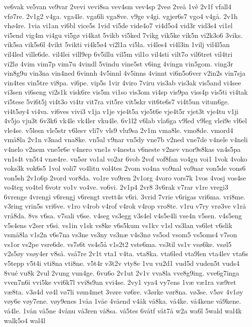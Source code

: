 {ve6vak
ve5van
ve9var
2vevi
vevi8sa
vev4sm
vev4sp
2veø
2veå
1vê
2v1f
vfall4
vfø7re.
2v1g2
v4ga.
vga4le.
vga6li
vga8ve.
v9ge
v4gi.
vgjer6s7
vgo4
v4gå.
2v1h
vhø4re.
1via
vi1an
vi6bl
vice5s
1vid
vi5de
vide4o7
vi4d5o4
vid3r
vid3s4
vi1el
vi5end
vig4m
vi4gu
vi5gø
vi4kat
5vikb
vi5ked
7vikg
vik5ke
vik5n
vi2k3o6
3viks.
vik5sa
vik5s6l
4vikt
5vikti
vi4k5ø4
vi2l1a
vi5la.
vi4les4
vi4l3in
1vilj
vil4l5an
vil4led
ville6de.
vil4lei
vill9ep
6v5illu
vil5m
vil1o
vil4sti
vilt7o
vil6tret
vil4tri
vi2lø
4vim
vim7p
vim7u
4vindl
5vindu
vine5st
v6ing
4vingn
vin5gom.
ving3r
vin8g9u
vin3na
vin4ned
6vinnh
4v5innl
4v5inns
4vinnt
vi6n5o6ver
v2in2s
vin7sja
vin4tes
vin5tre
vi8pa.
vi6pe.
vip5s
1vir
4viro
7viru
vis3ab
vis3ak
vis5and
vi4see
vi3sen
vi6seng
vi2s1k
visk6re
vis5m
vi1so
vis3om
vi4sp
vis9pa
viss4p
vis5ti
vi4tak
vi5tese
5vi6t5j
vi4t3o
vi4tr
vit7ra
vit5re
vit5skr
vit6te6s7
vi4t5un
vitun6ge.
vi4t5øy4
vi4va.
vi6ves
vivi3
v1ja
v1je
vje4t5a
vje5t6e
vje4t5r
vjet3t
vje4tu
v1ji
4v5jo
vju3t
6v3k6
vk4le
vk4ler
vku4le.
6v1l2
v6lab
vla6ga
v9led
v9leg
vlei9e
vl6el
vle4se.
v5lesn
vle5str
v6lesv
vli7v
vls9
vlu9sa
2v1m
vma8le.
vmo8de.
vmord4
vmå8la
2v1n
v3nad
vna8ke.
vn5al
v9nar
vn5dy
vne7b
v2ned
vne7de
v4nele
v4neli
v4nelo
v2nem
vne5r6e
v4nero
vne1s
v4nesta
v6neste
v2nev
vnor9s8kas
vn4s5pa
vn1s4t
vn5t4
vnæ4re.
vn5ør
vo1al
vo2ar
6vob
2vof
vof8fan
vo4gu
voi1
1vok
4voko
voks3k
vok6s5
1vol
voli7
vo4litu
vol4tes
2vom
vo4na
vo9nal
vo9nar
von5de
vons6
von5sh
2v1o6p
2vord
vor8da.
vo1re
vo9ren
2v1org
4voro
vors7k
1vos
4vosj
vos4se
vo4teg
vo4tel
6votr
vo1v
vo4ve.
vo6vi.
2v1p4
2vr8
3v6rak
v7rar
v1re
vregi3
6vrenge
4vrengi
v6rengj
v6rengt
vrett4s
v6ri.
3vrid
7vrie
v6rigas
vri6ma.
vri8me.
v3ring
vrin5s
vri6ve.
v1ro
v4rob
v4rof
v4rok
v4rop
vro8te.
v1ru
v7ry
vrø3ve
v1rå
vrå8da.
8vs
v6sa.
v7sali
v6se.
v4seg
vs3egg
v3s4el
v4s5e4li
vse4n
v5sen.
v4s5eng
v5s4ens
v2ser
v6si.
vs1in
v1sk
vs8ke
v6s5kum
vs1kv
v1sl
vs3lan
vs6let
v6slik
vsmå8la
v1s2n
v6s7na
vs3ne
vs3ny
vs3næ
v4s3nø
vs5od
vsom5
vs5oms4
v7son
vs1or
vs2pe
vsre6de.
vs7s6t
vs4s5å
v1s2t2
vste6ma.
vs3til
vs1v
vsø6ke.
vsøl5
v2s5øy
vsøy4er
v8så.
vså7re
2v1t
vta1
v4ta.
vta8ka.
vta6led
vta9len
vta4lev
vta6s
v5tepp
v5t4i
vti8na
vti8ne.
v5t4r
v3t2v
vty8e
1vu
vu2d1
vud5d
vuden5t
vuds4
8vué
vu8k
2vul
2vung
vun4ge.
6vu6o
2v1ut
2v1v
vva8la
vve8g9ing.
vve6g7inga
vven7n6i
vvi5ke
vvi6k7l
vvi8s9an
vvi4se.
2vy1
vya4
vy7ens
1væ
væ1ra
væ9ret
væ8ta.
v3ø4d
vø4l
vø7li
vøm4met
3vøre
vø6re.
v3ørke
vør8na.
vø3se.
v5øv
4v1øy
vøy6e
vøy7ene.
vøy9enes
1våa
1våe
4våend
v4åk
vå8ka.
vå4ke.
vå4kene
vå9kene.
vå4le.
1vån
vå5ne
4vånu
vå3ren
vå8sa.
vå5tes
6våtf
våt7å
w2a
wa6l
5wald
wal4k
walk5o4
wal4l
}
